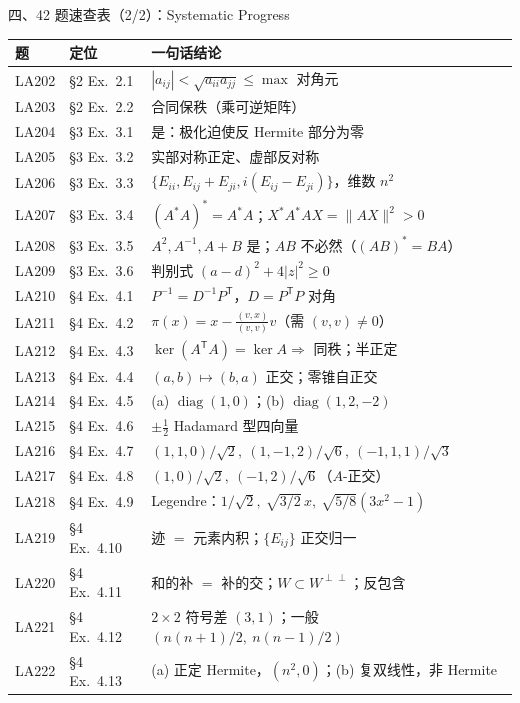 \documentclass[aspectratio=169,10pt,fontset=none]{ctexbeamer}
\begin{document}
\begin{frame}[t]{四、42 题速查表（2/2）：Systematic Progress}
  \centering\fontsize{6.9}{8.1}\selectfont
  \setlength{\tabcolsep}{2.5pt}
  \renewcommand{\arraystretch}{0.86}
  \begin{tabular}{@{}l l l@{}}
    \toprule
    题 & 定位 & 一句话结论\\
    \midrule
    LA202 & \S2 Ex.~2.1 & $|a_{ij}|<\sqrt{a_{ii}a_{jj}}\le\max$ 对角元\\
    LA203 & \S2 Ex.~2.2 & 合同保秩（乘可逆矩阵）\\
    LA204 & \S3 Ex.~3.1 & 是：极化迫使反 Hermite 部分为零\\
    LA205 & \S3 Ex.~3.2 & 实部对称正定、虚部反对称\\
    LA206 & \S3 Ex.~3.3 & $\{E_{ii},E_{ij}+E_{ji},i(E_{ij}-E_{ji})\}$，维数 $n^2$\\
    LA207 & \S3 Ex.~3.4 & $(A^*A)^*=A^*A$；$X^*A^*AX=\lVert AX\rVert^2>0$\\
    LA208 & \S3 Ex.~3.5 & $A^2,A^{-1},A+B$ 是；$AB$ 不必然（$(AB)^*=BA$）\\
    LA209 & \S3 Ex.~3.6 & 判别式 $(a-d)^2+4|z|^2\ge0$\\
    LA210 & \S4 Ex.~4.1 & $P^{-1}=D^{-1}P^{\mathsf T}$，$D=P^{\mathsf T}P$ 对角\\
    LA211 & \S4 Ex.~4.2 & $\pi(x)=x-\frac{(v,x)}{(v,v)}v$（需 $(v,v)\ne0$）\\
    LA212 & \S4 Ex.~4.3 & $\ker(A^{\mathsf T}A)=\ker A\Rightarrow$ 同秩；半正定\\
    LA213 & \S4 Ex.~4.4 & $(a,b)\mapsto(b,a)$ 正交；零锥自正交\\
    LA214 & \S4 Ex.~4.5 & (a) $\operatorname{diag}(1,0)$；(b) $\operatorname{diag}(1,2,-2)$\\
    LA215 & \S4 Ex.~4.6 & $\pm\frac12$ Hadamard 型四向量\\
    LA216 & \S4 Ex.~4.7 & $(1,1,0)/\sqrt2,\ (1,-1,2)/\sqrt6,\ (-1,1,1)/\sqrt3$\\
    LA217 & \S4 Ex.~4.8 & $(1,0)/\sqrt2,\ (-1,2)/\sqrt6$（$A$-正交）\\
    LA218 & \S4 Ex.~4.9 & Legendre：$1/\sqrt2,\ \sqrt{3/2}\,x,\ \sqrt{5/8}(3x^2-1)$\\
    LA219 & \S4 Ex.~4.10 & 迹 $=$ 元素内积；$\{E_{ij}\}$ 正交归一\\
    LA220 & \S4 Ex.~4.11 & 和的补 $=$ 补的交；$W\subset W^{\perp\perp}$；反包含\\
    LA221 & \S4 Ex.~4.12 & $2\times2$ 符号差 $(3,1)$；一般 $(n(n{+}1)/2,\ n(n{-}1)/2)$\\
    LA222 & \S4 Ex.~4.13 & (a) 正定 Hermite，$(n^2,0)$；(b) 复双线性，非 Hermite\\
    \bottomrule
  \end{tabular}
\end{frame}
\end{document}

